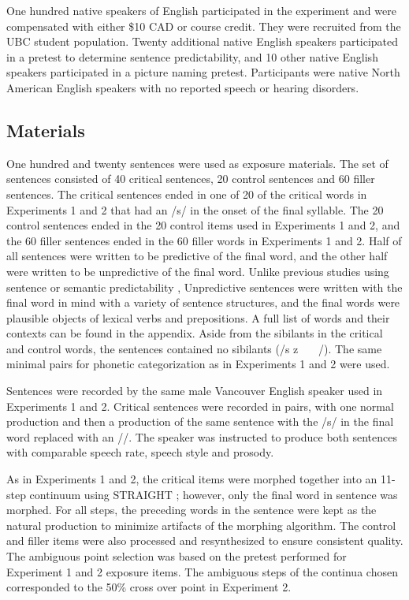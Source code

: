 One hundred native speakers of English participated in the experiment and were compensated with either \$10 CAD or course credit. 
They were recruited from the UBC student population.  
Twenty additional native English speakers participated in a pretest to determine sentence predictability, and 10 other native English speakers participated in a picture naming pretest.
Participants were native North American English speakers with no reported speech or hearing disorders.

\subsection{Materials}

One hundred and twenty sentences were used as exposure materials.  
The set of sentences consisted of 40 critical sentences, 20 control sentences and 60 filler sentences. 
The critical sentences ended in one of 20 of the critical words in Experiments 1 and 2 that had an /s/ in the onset of the final syllable.  
The 20 control sentences ended in the 20 control items used in Experiments 1 and 2, and the 60 filler sentences ended in the 60 filler words in Experiments 1 and 2.  
Half of all sentences were written to be predictive of the final word, and the other half were written to be unpredictive of the final word.  
Unlike previous studies using sentence or semantic predictability \citep{Kalikow1977}, Unpredictive sentences were written with the final word in mind with a variety of sentence structures, and the final words were plausible objects of lexical verbs and prepositions.  
A full list of words and their contexts can be found in the appendix. Aside from the sibilants in the critical and control words, the sentences contained no sibilants (/s z \textesh\ \textyogh\ \textteshlig\  \textdyoghlig/).  
The same minimal pairs for phonetic categorization as in Experiments 1 and 2 were used.

Sentences were recorded by the same male Vancouver English speaker used in Experiments 1 and 2.  
Critical sentences were recorded in pairs, with one normal production and then a production of the same sentence with the /s/ in the final word replaced with an /\textesh/.  
The speaker was instructed to produce both sentences with comparable speech rate, speech style and prosody.

As in Experiments 1 and 2, the critical items were morphed together into an 11-step continuum using STRAIGHT \citep{Kawahara2008}; however, only the final word in sentence was morphed.  
For all steps, the preceding words in the sentence were kept as the natural production to minimize artifacts of the morphing algorithm.  
The control and filler items were also processed and resynthesized to ensure consistent quality.  The ambiguous point selection was based on the pretest performed for Experiment 1 and 2 exposure items.  
The ambiguous steps of the continua chosen corresponded to the 50\% cross over point in Experiment 2.

